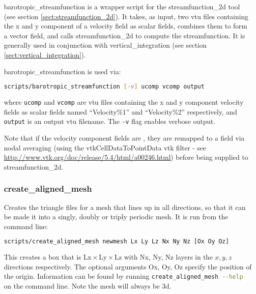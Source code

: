 barotropic\_streamfunction is a wrapper script for the streamfunction\_2d tool
(see section \ref{sect:streamfunction_2d}). It takes, as input, two vtu files containing
the x and y component of a velocity field as scalar fields, combines them to
form a vector field, and calls streamfunction\_2d to compute the streamfunction.
It is generally used in conjunction with
vertical\_integration (see section \ref{sect:vertical_integration}).

barotropic\_streamfunction is used via:

\begin{lstlisting}[language = Bash]
scripts/barotropic_streamfunction [-v] ucomp vcomp output
\end{lstlisting}

where \lstinline[language = Bash]+ucomp+ and \lstinline[language = Bash]+vcomp+
are vtu files containing the x and y component velocity fields as scalar fields
named ``Velocity\%1'' and ``Velocity\%2'' respectively, and
\lstinline[language = Bash]+output+ is an output vtu filename. The
\lstinline[language = Bash]+-v+ flag enables verbose output.

Note that if the velocity component fields are \Pzero, they are remapped
to a \Pone field via nodal averaging (using the vtkCellDataToPointData vtk filter -
see \url{http://www.vtk.org/doc/release/5.4/html/a00246.html})
before being supplied to streamfunction\_2d.


\subsubsection{create\_aligned\_mesh}
\label{sect:create_aligned_mesh}

Creates the triangle files for a mesh that lines up in all directions, so that it can be made it into a singly, doubly or triply periodic mesh. It is run from the command line:

\begin{lstlisting}[language = Bash]
scripts/create_aligned_mesh newmesh Lx Ly Lz Nx Ny Nz [Ox Oy Oz]
\end{lstlisting}

This creates a box that is $\mathrm{Lx} \times \mathrm{Ly} \times \mathrm{Lz}$ with Nx, Ny, Nz layers in the $x,y,z$ directions respectively. The optional arguments Ox, Oy, Oz  specify the position of the origin. Information can be found by running \lstinline[language = bash]+create_aligned_mesh --help+ on the command line. Note the mesh will always be 3d.

